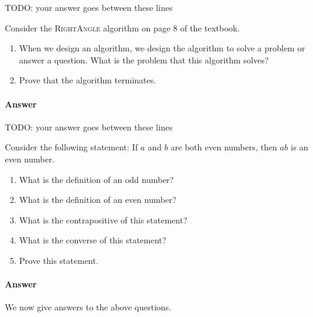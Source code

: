 \documentclass{article}
\begin{document}

TODO: your answer goes between these lines




\nextprob
Consider the \textsc{RightAngle} algorithm on page 8 of the textbook.
\begin{enumerate}
    \item When we design an algorithm, we design the algorithm to solve a
        problem or answer a question.  What is the problem that this algorithm
        solves?
    \item Prove that the algorithm terminates.
\end{enumerate}

\paragraph{Answer}


TODO: your answer goes between these lines




\nextprob
Consider the following statement: If $a$ and $b$ are both even numbers, then $ab$ is
an even number.
\begin{enumerate}
    \item What is the definition of an odd number?
    \item What is the definition of an even number?
    \item What is the contrapositive of this statement?
    \item What is the converse of this statement?
    \item Prove this statement.
\end{enumerate}

\paragraph{Answer}


We now give answers to the above questions.
\end{document}

